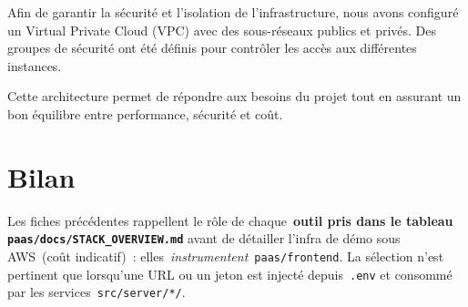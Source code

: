 Afin de garantir la sécurité et l’isolation de l’infrastructure, nous avons configuré un Virtual Private Cloud (VPC) avec des sous-réseaux publics et privés. Des groupes de sécurité ont été définis pour contrôler les accès aux différentes instances.

Cette architecture permet de répondre aux besoins du projet tout en assurant un bon équilibre entre performance, sécurité et coût.
\section{Bilan}

Les fiches précédentes rappellent le rôle de chaque~\textbf{outil pris dans le tableau \texttt{paas/docs/STACK\_OVERVIEW.md}} avant de détailler l'infra de démo sous AWS~(coût indicatif)~: elles~\emph{instrumentent}~\texttt{paas/frontend}. La sélection n'est pertinent que lorsqu'une URL ou un jeton est injecté depuis~\texttt{.env} et consommé par les services~\texttt{src/server/*/}.
